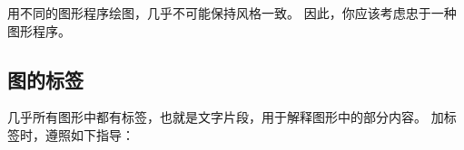 \bohs

用不同的图形程序绘图，几乎不可能保持风格一致。
因此，你应该考虑忠于一种图形程序。

\eohs

\subsection{图的标签}

\bohs

几乎所有图形中都有标签，也就是文字片段，用于解释图形中的部分内容。
加标签时，遵照如下指导：

\eohs

